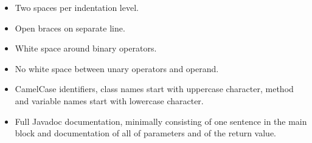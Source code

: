 \documentclass[a4paper,fleqn]{article}
\begin{document}
\begin{itemize}

\item Two spaces per indentation level.

\item Open braces on separate line.

\item White space around binary operators.

\item No white space between unary operators and operand.

\item CamelCase identifiers, class names start with uppercase
  character, method and variable names start with lowercase character.

\item Full Javadoc documentation, minimally consisting of one sentence
  in the main block and documentation of all of parameters and of the
  return value.

\end{itemize}
\end{document}
